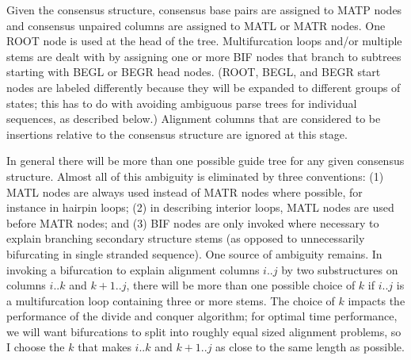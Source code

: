 \documentclass[11pt]{article}
\newif\ifdraft
\begin{document}
\ifdraft
\begin{figure}[t]
\begin{center}
\texttt{[image: Figures/cm\_nodetree]}
\end{center}
\caption{\textbf{The structural alignment is converted to a guide
tree.} Left: the consensus secondary structure is derived from the
annotated alignment in Figure~\ref{fig:input_alignment}. Numbers in
the circles indicate alignment column coordinates: e.g.  column 4 base
pairs with column 14, and so on. Right: the CM guide tree
corresponding to this consensus structure. The nodes of the tree are
numbered 1..24 in preorder traversal (see text). MATP, MATL, and MATR
nodes are associated with the columns they generate: e.g., node 6 is a
MATP (pair) node that is associated with the base-paired columns 4 and
14.}
\label{fig:cm_nodetree}
\end{figure}
\fi

Given the consensus structure, consensus base pairs are assigned to
MATP nodes and consensus unpaired columns are assigned to MATL or MATR
nodes. One ROOT node is used at the head of the tree.  Multifurcation
loops and/or multiple stems are dealt with by assigning one or more
BIF nodes that branch to subtrees starting with BEGL or BEGR head
nodes. (ROOT, BEGL, and BEGR start nodes are labeled differently
because they will be expanded to different groups of states; this has
to do with avoiding ambiguous parse trees for individual sequences, as
described below.) Alignment columns that are considered to be
insertions relative to the consensus structure are ignored at this
stage.

In general there will be more than one possible guide tree for any
given consensus structure. Almost all of this ambiguity is eliminated
by three conventions: (1) MATL nodes are always used instead of MATR
nodes where possible, for instance in hairpin loops; (2) in describing
interior loops, MATL nodes are used before MATR nodes; and (3) BIF
nodes are only invoked where necessary to explain branching secondary
structure stems (as opposed to unnecessarily bifurcating in single
stranded sequence). One source of ambiguity remains. In invoking a
bifurcation to explain alignment columns $i..j$ by two substructures
on columns $i..k$ and $k+1..j$, there will be more than one possible
choice of $k$ if $i..j$ is a multifurcation loop containing three or
more stems. The choice of $k$ impacts the performance of the divide
and conquer algorithm; for optimal time performance, we will want
bifurcations to split into roughly equal sized alignment problems, so
I choose the $k$ that makes $i..k$ and $k+1..j$ as close to the same
length as possible.
\end{document}
